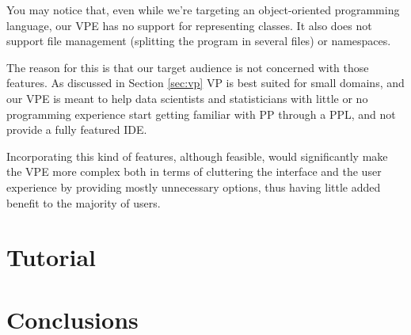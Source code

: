 You may notice that, even while we're targeting an object-oriented programming
language, our VPE has no support for representing classes. It also does not
support file management (splitting the program in several files) or namespaces.

The reason for this is that our target audience is not concerned with those features.
As discussed in Section \ref{sec:vp} VP is best suited for small domains, and our
VPE is meant to help data scientists and statisticians with little or no programming
experience start getting familiar with PP through a PPL, and not provide a
fully featured IDE.

Incorporating this kind of features, although feasible, would significantly
make the VPE more complex both in terms of cluttering the interface and the user
experience by providing mostly unnecessary options, thus having little added
benefit to the majority of users.

\section{Tutorial}

\section{Conclusions}
